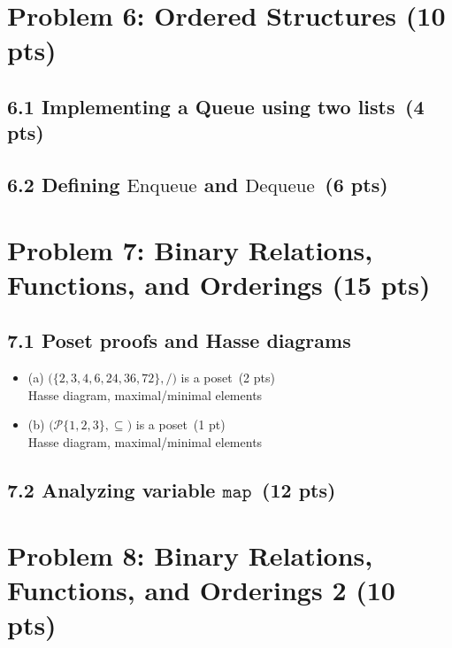 \documentclass[11pt]{article}
\begin{document}

\newpage
\section{Problem 6: Ordered Structures (10 pts)}

\subsection*{6.1 Implementing a Queue using two lists \,(4 pts)}

\subsection*{6.2 Defining \(\text{Enqueue}\) and \(\text{Dequeue}\) \,(6 pts)}

\newpage
\section{Problem 7: Binary Relations, Functions, and Orderings (15 pts)}

\subsection*{7.1 Poset proofs and Hasse diagrams}
\begin{itemize}
    \item (a) \(\bigl(\{2,3,4,6,24,36,72\}, /\bigr)\) is a poset \,(2 pts) \\
          Hasse diagram, maximal/minimal elements
    \item (b) \(\bigl(\mathcal{P}\{1,2,3\}, \subseteq\bigr)\) is a poset \,(1 pt) \\
          Hasse diagram, maximal/minimal elements
\end{itemize}

\subsection*{7.2 Analyzing variable \(\texttt{map}\) \,(12 pts)}

\newpage
\section{Problem 8: Binary Relations, Functions, and Orderings 2 (10 pts)}
\end{document}
